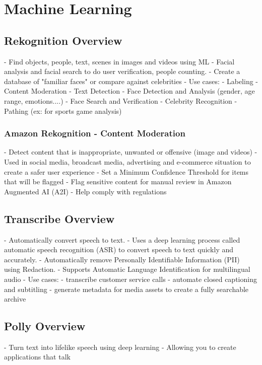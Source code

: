 \documentclass[11pt]{book}
\begin{document}
    \chapter{Machine Learning}


    \section{Rekognition Overview}
    - Find objects, people, text, scenes in images and videos using ML
    - Facial analysis and facial search to do user verification, people counting.
    - Create a database of "familiar faces" or compare against celebrities
    - Use cases:
    - Labeling
    - Content Moderation
    - Text Detection
    - Face Detection and Analysis (gender, age range, emotions....)
    - Face Search and Verification
    - Celebrity Recognition
    - Pathing (ex: for sports game analysis)

    \subsection{Amazon Rekognition - Content Moderation}
    - Detect content that is inappropriate, unwanted or offensive (image and videos)
    - Used in social media, broadcast media, advertising and e-commerce situation to create a safer user experience
    - Set a Minimum Confidence Threshold for items that will be flagged
    - Flag sensitive content for manual review in Amazon Augmented AI (A2I)
    - Help comply with regulations


    \section{Transcribe Overview}
    - Automatically convert speech to text.
    - Uses a deep learning process called automatic speech recognition (ASR) to convert speech to text quickly and accurately.
    - Automatically remove Personally Identifiable Information (PII) using Redaction.
    - Supports Automatic Language Identification for multilingual audio
    - Use cases:
    - transcribe customer service calls
    - automate closed captioning and subtitling
    - generate metadata for media assets to create a fully searchable archive


    \section{Polly Overview}
    - Turn text into lifelike speech using deep learning
    - Allowing you to create applications that talk
\end{document}
